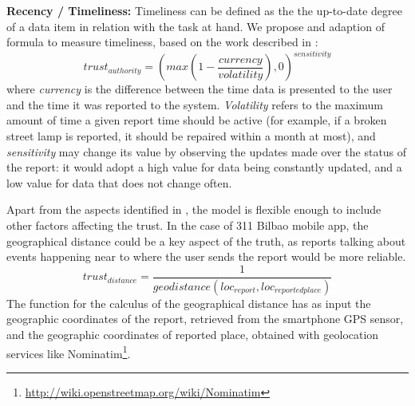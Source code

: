 \textbf{Recency / Timeliness:} Timeliness can be defined as the the up-to-date degree of a data item in relation with the task at hand. We propose and adaption of \cite{Hartig09usingweb} formula to measure timeliness, based on the work described in \cite{Ballou:1998:MIM:291329.291335}:
%
\begin{equation}
    trust_{authority} = (max(1-\frac{currency}{volatility}), 0)^{sensitivity}
\end{equation}
%
where \emph{currency} is the difference between the time data is presented to the user and the time it was reported to the system. \emph{Volatility} refers to the maximum amount of time a given report time should be active (for example, if a broken street lamp is reported, it should be repaired within a month at most), and \emph{sensitivity} may change its value by observing the updates made over the status of the report: it would adopt a high value for data being constantly updated, and a low value for data that does not change often.

Apart from the aspects identified in \cite{gil2007towards}, the model is flexible enough to include other factors affecting the trust. In the case of 311 Bilbao mobile app, the geographical distance could be a key aspect of the truth, as reports talking about events happening near to where the user sends the report would be more reliable.
%
\begin{equation}
trust_{distance} = \frac{1}{geodistance(loc_{report}, loc_{reportedplace})}
\end{equation}
%
The function for the calculus of the geographical distance has as input the geographic coordinates of the report, retrieved from the smartphone GPS sensor, and the geographic coordinates of reported place, obtained with geolocation services like Nominatim\footnote{\url{http://wiki.openstreetmap.org/wiki/Nominatim}}.
